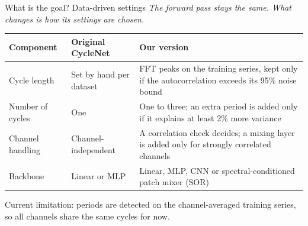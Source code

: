 \documentclass[aspectratio=169]{beamer}
\begin{document}
\begin{frame}{What is the goal? Data-driven settings}
\small
\textit{The forward pass stays the same. What changes is how its settings are chosen.}\par
\vspace{0.7em}
\renewcommand{\arraystretch}{1.08}
\begin{tabular}{@{}>{\raggedright\arraybackslash}p{3.0cm}>{\raggedright\arraybackslash}p{3.4cm}>{\raggedright\arraybackslash}p{6.2cm}@{}}
\toprule
\textbf{Component} & \textbf{Original CycleNet} & \textbf{Our version} \\
\midrule
Cycle length & Set by hand per dataset & FFT peaks on the training series, kept only if the autocorrelation exceeds its 95\% noise bound \\
Number of cycles & One & One to three; an extra period is added only if it explains at least 2\% more variance \\
Channel handling & Channel-independent & A correlation check decides; a mixing layer is added only for strongly correlated channels \\
Backbone & Linear or MLP & Linear, MLP, CNN or spectral-conditioned patch mixer (SOR) \\
\bottomrule
\end{tabular}
\vspace{0.5em}

{\footnotesize\textcolor{muted}{Current limitation: periods are detected on the channel-averaged training series, so all channels share the same cycles for now.}}
\end{frame}
\end{document}
